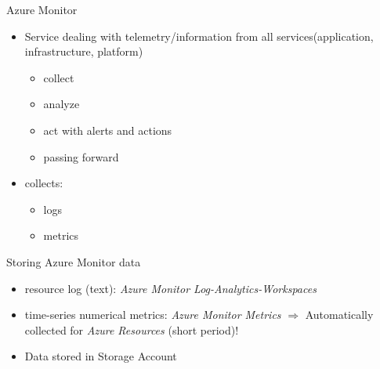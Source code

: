 

\begin{flashcard}[Definition]{Azure Monitor}
  \begin{itemize}
    \item Service dealing with telemetry/information from all services\newline (application, infrastructure, platform)
      \begin{itemize}
        \item collect
        \item analyze
        \item act with alerts and actions
        \item passing forward
      \end{itemize}
 
    \item collects:
      \begin{itemize}
        \item logs
        \item metrics
      \end{itemize}
  \end{itemize}
\end{flashcard}

\begin{flashcard}[Definition]{Storing Azure Monitor data}
  \begin{itemize}
    \item resource log (text): \emph{Azure Monitor Log-Analytics-Workspaces}
    \item time-series numerical metrics: \emph{Azure Monitor Metrics}\newline
      $\Rightarrow$ Automatically collected for \emph{Azure Resources} (short period)!
    \item Data stored in Storage Account
  \end{itemize}
\end{flashcard}

